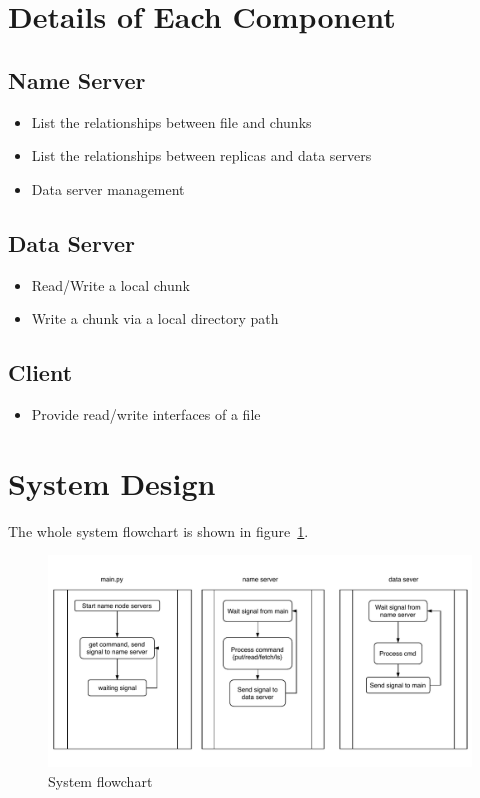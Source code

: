 \documentclass{article}
\begin{document}
\section{Details of Each Component}
\subsection{Name Server}
\begin{itemize}
    \item List the relationships between file and chunks
    \item List the relationships between replicas and data servers
    \item Data server management
\end{itemize}

\subsection{Data Server}
\begin{itemize}
    \item Read/Write a local chunk
    \item Write a chunk via a local directory path
\end{itemize}

\subsection{Client}
\begin{itemize}
    \item Provide read/write interfaces of a file
\end{itemize}

\section{System Design}
The whole system flowchart is shown in figure~\ref{fig:flowchart}.
\begin{figure}[tbh]
    \centering
    \includegraphics[scale=.8]{minidfs}
    \caption{System flowchart}
    \label{fig:flowchart}
\end{figure}
\end{document}
